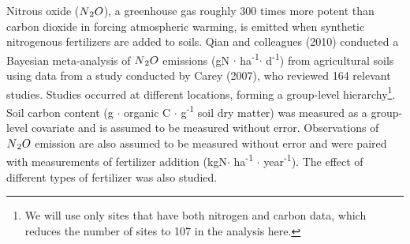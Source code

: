 \documentclass[12pt, oneside]{article}
\begin{document}
Nitrous oxide ($N\textsubscript{2}O$), a greenhouse gas roughly 300 times more potent than carbon dioxide in forcing atmospheric warming, is emitted when synthetic nitrogenous fertilizers are added to soils. Qian and colleagues (2010) conducted a Bayesian meta-analysis of $N\textsubscript{2}O$ emissions (gN $\cdot$ ha\textsuperscript{-1}$\cdot$ d\textsuperscript{-1})  from agricultural soils using data from a study conducted by Carey (2007), who reviewed 164 relevant studies. Studies occurred at different locations, forming a group-level hierarchy\footnote{We will use only sites that have both nitrogen and carbon data, which reduces the number of sites to 107 in the analysis here.}. Soil carbon content (g $\cdot$ organic C $\cdot$ g\textsuperscript{-1} soil dry matter) was measured as a group-level covariate and is assumed to be measured without error. Observations of $N\textsubscript{2}O$ emission are also assumed to be measured without error and were paired with measurements of fertilizer addition (kgN$\cdot$ ha\textsuperscript{-1} $\cdot$ year\textsuperscript{-1}). The effect of different types of fertilizer was also studied. 
\end{document}
